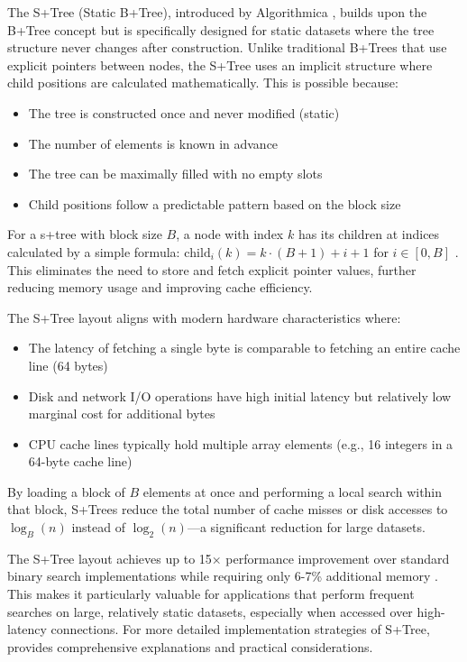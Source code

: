 The S+Tree (Static B+Tree), introduced by Algorithmica \citep{static_b_trees}, builds upon the B+Tree concept but is specifically designed for static datasets where the tree structure never changes after construction. Unlike traditional B+Trees that use explicit pointers between nodes, the S+Tree uses an implicit structure where child positions are calculated mathematically.
This is possible because:
\begin{itemize}
  \item The tree is constructed once and never modified (static)
  \item The number of elements is known in advance
  \item The tree can be maximally filled with no empty slots
  \item Child positions follow a predictable pattern based on the block size
\end{itemize}

For a \ac{s+tree} with block size $B$, a node with index $k$ has its children at indices calculated by a simple formula: $\text{child}_i(k) = k \cdot (B+1) + i + 1$ for $i \in [0, B]$ \citep{static_b_trees}. This eliminates the need to store and fetch explicit pointer values, further reducing memory usage and improving cache efficiency.

The S+Tree layout aligns with modern hardware characteristics where:
\begin{itemize}
  \item The latency of fetching a single byte is comparable to fetching an entire cache line (64 bytes)
  \item Disk and network I/O operations have high initial latency but relatively low marginal cost for additional bytes
  \item CPU cache lines typically hold multiple array elements (e.g., 16 integers in a 64-byte cache line)
\end{itemize}

By loading a block of $B$ elements at once and performing a local search within that block, S+Trees reduce the total number of cache misses or disk accesses to $\log_B(n)$ instead of $\log_2(n)$—a significant reduction for large datasets.

The S+Tree layout achieves up to 15× performance improvement over standard binary search implementations while requiring only 6-7\% additional memory \citep{static_b_trees}. This makes it particularly valuable for applications that perform frequent searches on large, relatively static datasets, especially when accessed over high-latency connections. For more detailed implementation strategies of S+Tree, \citet{koerkamp_2024} provides comprehensive explanations and practical considerations.